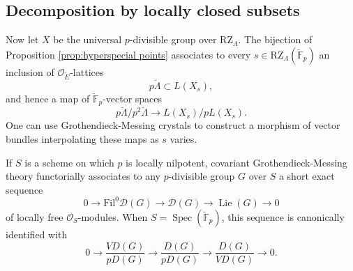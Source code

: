 \documentclass[11pt]{alggeom}
\newcommand{\F}{\mathbb F}
\newcommand{\co}{\mathcal O}
\DeclareMathOperator{\Spec}{Spec}
\DeclareMathOperator{\Lie}{Lie}
\begin{document}

\subsection{Decomposition by locally closed subsets}
\label{ss:hyperspecial strata}







Now let $X$ be the universal $p$-divisible group over $\mathrm{RZ}_\Lambda$.
 The bijection of Proposition \ref{prop:hyperspecial points} associates to every  $s \in \mathrm{RZ}_\Lambda(\breve{\F}_p)$ an inclusion of $\co_{\breve{E}}$-lattices
 \[
 p \breve{\Lambda} \subset L(X_s),
 \]
and hence a map of  $\breve{\F}_p$-vector spaces 
 \begin{equation}\label{stratum map}
  p \breve{\Lambda} / p^2 \breve{\Lambda} \to L(X_s)/pL(X_s).
 \end{equation}
 One can use Grothendieck-Messing crystals  to construct a morphism of vector bundles interpolating these maps as $s$ varies.




If $S$ is a scheme on which $p$ is locally nilpotent,   covariant  Grothendieck-Messing theory functorially associates to any $p$-divisible group $G$ over $S$ a short exact sequence
\begin{equation}\label{GMbundles}
0 \to \mathrm{Fil}^0 \mathscr{D}(G)  \to \mathscr{D}(G) \to \Lie(G) \to 0
\end{equation}
 of locally free $\co_S$-modules.  When $S=\Spec(\breve{\F}_p)$, this sequence is canonically identified with
 \[
 0 \to \frac{VD(G)}{pD(G)}   \to\frac{D(G)}{pD(G)} \to \frac{D(G)}{VD(G)} \to 0.
 \]
\end{document}
